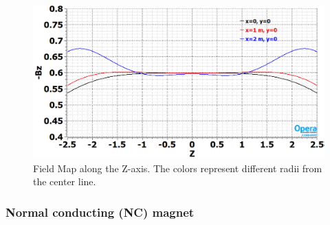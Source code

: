 %
\begin{figure}[h] 
\centering
\includegraphics[width=0.95\columnwidth]{graphics/dune_nd_magnet_sc_fieldmap.png} 
\caption{Field Map along the Z-axis. The colors represent different radii from the center line.} 
\label{fig:dune_nd_magnet_sc_fieldmap} 
\end{figure}
%
\subsubsection{Normal conducting (NC) magnet}

